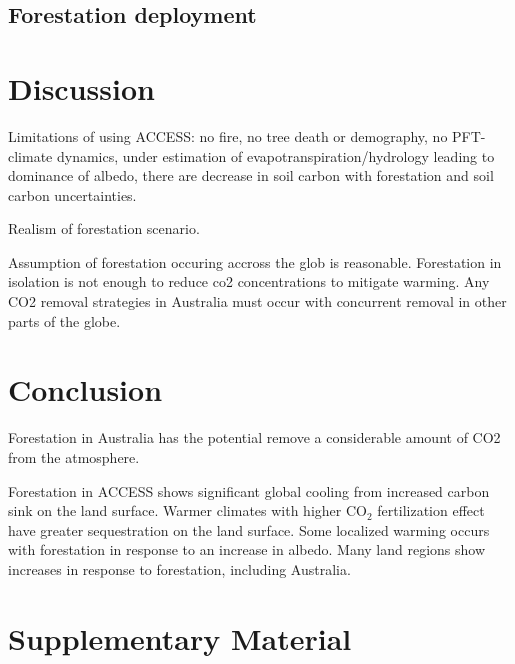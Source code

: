 \documentclass[]{article}
\begin{document}
\subsection{Forestation deployment}


\section{Discussion}

Limitations of using ACCESS: no fire, no tree death or demography, no PFT-climate dynamics, under estimation of evapotranspiration/hydrology leading to dominance of albedo, there are decrease in soil carbon with forestation and soil carbon uncertainties.

Realism of forestation scenario.

Assumption of forestation occuring accross the glob is reasonable.
Forestation in isolation is not enough to reduce co2 concentrations to mitigate warming.
Any CO2 removal strategies in Australia must occur with concurrent removal in other parts of the globe.

\section{Conclusion}

Forestation in Australia has the potential remove a considerable amount of CO2 from the atmosphere.

Forestation in ACCESS shows significant global cooling from increased carbon sink on the land surface.
Warmer climates with higher CO$_2$ fertilization effect have greater sequestration on the land surface.
Some localized warming occurs with forestation in response to an increase in albedo. 
Many land regions show increases in response to forestation, including Australia.

\printbibliography

\section{Supplementary Material}
\setcounter{figure}{0}
\end{document}
